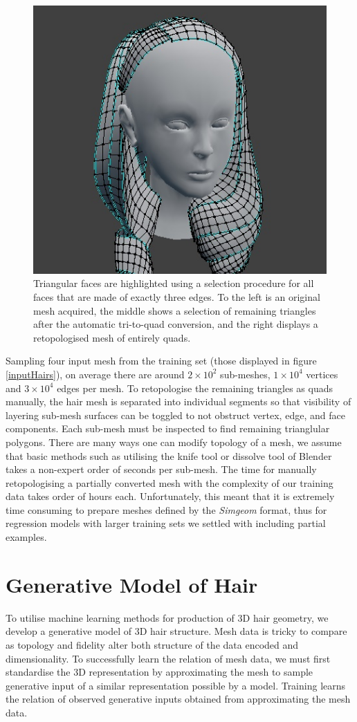 \documentclass[ %
author={Dillon Keith Diep},
supervisor={Dr. Carl Henrik Ek},
degree={MEng},
title={ART-CG:},
subtitle={Assisted Real-time Content Generation of 3D Hair by Learning Manifolds},
type={Research},
year={2017} ]{dissertation}
\begin{document}
\begin{figure}[!h]
	\includegraphics[scale=2]{images/triToQuad3}
	\caption{Triangular faces are highlighted using a selection procedure for all faces that are made of exactly three edges. To the left is an original mesh acquired, the middle shows a selection of remaining triangles after the automatic tri-to-quad conversion, and the right displays a retopologised mesh of entirely quads.}
\end{figure}

Sampling four input mesh from the training set (those displayed in figure \ref{inputHairs}), on average there are around $2 \times 10^{2}$ sub-meshes, $1 \times 10^{4}$ vertices and  $3 \times 10^{4}$ edges per mesh. To retopologise the remaining triangles as quads manually, the hair mesh is separated into individual segments so that visibility of layering sub-mesh surfaces can be toggled to not obstruct vertex, edge, and face components. Each sub-mesh must be inspected to find remaining trianglular polygons. There are many ways one can modify topology of a mesh, we assume that basic methods such as utilising the knife tool or dissolve tool of Blender takes a non-expert order of seconds per sub-mesh. The time for manually retopologising a partially converted mesh with the complexity of our training data takes order of hours each. Unfortunately, this meant that it is extremely time consuming to prepare meshes defined by the \textit{Simgeom} format, thus for regression models with larger training sets we settled with including partial examples.

\section{Generative Model of Hair}
To utilise machine learning methods for production of 3D hair geometry,  we develop a generative model of 3D hair structure. Mesh data is tricky to compare as topology and fidelity alter both structure of the data encoded and dimensionality. To successfully learn the relation of mesh data, we must first standardise the 3D representation by approximating the mesh to sample generative input of a similar representation possible by a model. Training learns the relation of observed generative inputs obtained from approximating the mesh data.
\end{document}

